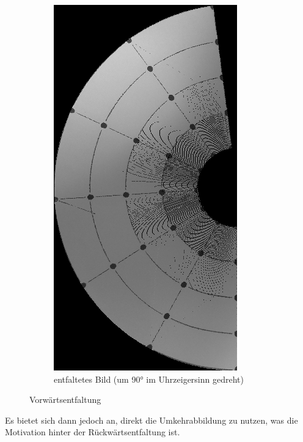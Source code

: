 \begin{figure}[!htb]
\begin{subfigure}{.5\textwidth}
		\includegraphics[angle=-90, width=.9\textwidth]{images/coneRaspUnWarpForward.png}
		\caption{entfaltetes Bild (um 90° im Uhrzeigersinn gedreht)}
	\end{subfigure}
	\caption{Vorwärtsentfaltung}
	\label{fig:forwardUnfold}
\end{figure}

Es bietet sich dann jedoch an, direkt die Umkehrabbildung zu nutzen, was die Motivation hinter der Rückwärtsentfaltung ist.

